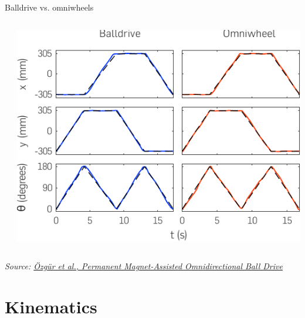 \documentclass[compress]{beamer}
\newcommand{\source}[2]{{\tiny\it Source: \href{#1}{#2}}}
\begin{document}
\begin{frame}{Balldrive vs. omniwheels}
\begin{columns}
\begin{column}{0.4\linewidth}
\begin{center}
            \end{center}
        \end{column}
        \begin{column}{0.6\linewidth}
            \includegraphics[width=\linewidth]{balldrive-vs-omniwheel}
        \end{column}
    \end{columns}

    \begin{center}

        \source{http://ayberkozgur.com/_media/publications:balldrive.pdf}{\"Ozg\"ur et al., Permanent Magnet-Assisted Omnidirectional Ball Drive}
    \end{center}

\end{frame}


\section{Kinematics}
\end{document}

